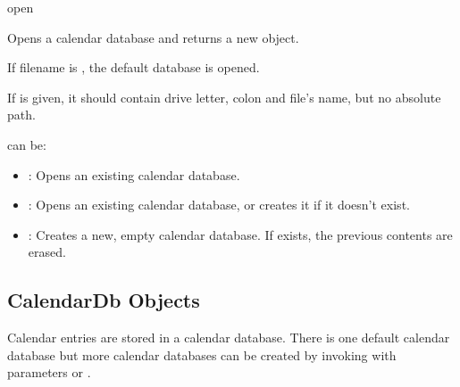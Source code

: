 \begin{funcdesc}{open}{}

Opens a calendar database and returns a new  object.

If filename is , the default database is opened.

If  is given, it should contain drive letter, colon and file's name, 
but no absolute path.

 can be:

\begin{itemize}
\item {}: Opens an existing calendar database.
\item {}: Opens an existing calendar database, or creates it if it doesn't exist.
\item {}: Creates a new, empty calendar database. If  exists, the previous contents are erased.
\end{itemize}

\end{funcdesc}

\subsection{CalendarDb Objects}
\label{subsec:calendardb}

Calendar entries are stored in a calendar database. There is 
one default calendar database but more calendar databases can be created by 
invoking  with parameters or . 

